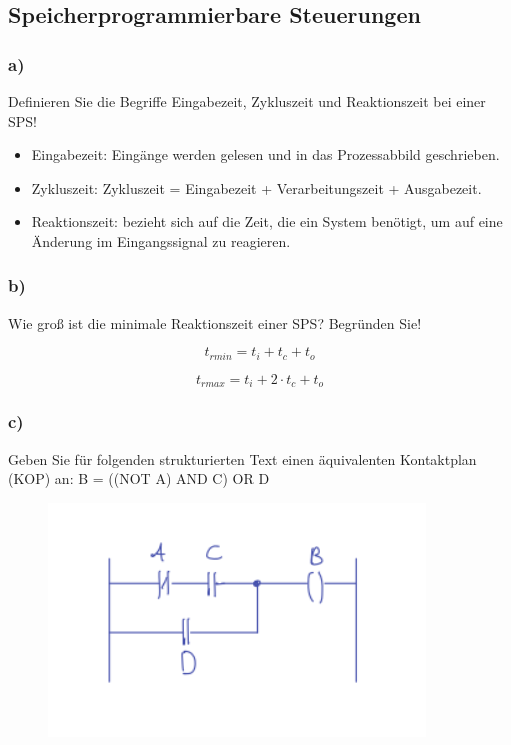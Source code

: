 \subsection{Speicherprogrammierbare Steuerungen}

\subsubsection{a)}
Definieren Sie die Begriffe Eingabezeit, Zykluszeit und Reaktionszeit bei einer SPS!

\begin{itemize}
  \item Eingabezeit: Eingänge werden gelesen und in das Prozessabbild geschrieben.
  \item Zykluszeit: Zykluszeit = Eingabezeit + Verarbeitungszeit + Ausgabezeit. 
  \item Reaktionszeit: bezieht sich auf die Zeit, die ein System benötigt, um auf eine Änderung im Eingangssignal zu reagieren.
\end{itemize}

\subsubsection{b)}
Wie groß ist die minimale Reaktionszeit einer SPS? Begründen Sie!

\begin{equation}
  t_{rmin} = t_i + t_c + t_o
\end{equation}

\begin{equation}
  t_{rmax} = t_i + 2\cdot t_c + t_o
\end{equation}


\subsubsection{c)}
Geben Sie für folgenden strukturierten Text einen äquivalenten Kontaktplan (KOP) an: B = ((NOT A)
AND C) OR D

\begin{figure}[H]
  \includegraphics[width=10cm]{images/KA280521/6c.PNG}
  \centering
\end{figure}